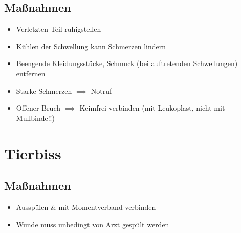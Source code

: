 \section*{Maßnahmen}
\begin{itemize}
    \item Verletzten Teil ruhigstellen
    \item Kühlen der Schwellung kann Schmerzen lindern
    \item Beengende Kleidungsstücke, Schmuck (bei auftretenden Schwellungen) entfernen
    \item Starke Schmerzen $\implies$ Notruf
    \item Offener Bruch $\implies$ Keimfrei verbinden (mit Leukoplast, nicht mit Mullbinde!!)
\end{itemize}
\chapter{Tierbiss}
\section*{Maßnahmen}
\begin{itemize}
    \item Ausspülen \& mit Momentverband verbinden
    \item Wunde muss unbedingt von Arzt gespült werden
\end{itemize}